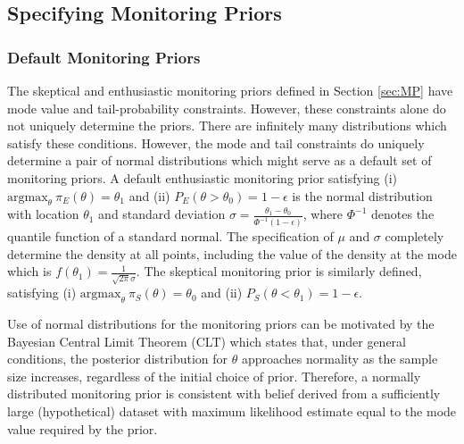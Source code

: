 \documentclass[AMA,STIX1COL,doublespace]{WileyNJD-v2}
\begin{document}
\subsection{Specifying Monitoring Priors}\label{sec:mps}
\subsubsection{Default Monitoring Priors}
The skeptical and enthusiastic monitoring priors defined in Section \ref{sec:MP} have mode value and tail-probability constraints. 
%
However, these constraints alone do not uniquely determine the priors.
%
There are infinitely many distributions which satisfy these conditions.
%
However, the mode and tail constraints do uniquely determine a pair of normal distributions which might serve as a default set of monitoring priors. 
%
%
A default enthusiastic monitoring prior satisfying (i) $\text{argmax}_\theta~\pi_E(\theta)=\theta_1$
and (ii) $P_E(\theta > \theta_0)=1-\epsilon$ is the normal distribution with location $\theta_1$ and standard deviation $\sigma=\frac{\theta_1-\theta_0}{\Phi^{-1}(1-\epsilon)}$, where $\Phi^{-1}$ denotes the quantile function of a standard normal.
%
The specification of $\mu$ and $\sigma$ completely determine the density at all points, including the value of the density at the mode which is $f(\theta_1)=\frac{1}{\sqrt{2\pi}\sigma}$.
%
The skeptical monitoring prior is similarly defined, satisfying (i) $\text{argmax}_\theta~\pi_S(\theta)=\theta_0$ and (ii) $P_S(\theta < \theta_1)=1-\epsilon$.

Use of normal distributions for the monitoring priors can be motivated by the Bayesian Central Limit Theorem (CLT) \citep{LeCam2000} which states that, under general conditions, the posterior distribution for $\theta$ approaches normality as the sample size increases, regardless of the initial choice of prior.
%
Therefore, a normally distributed monitoring prior is consistent with belief derived from a sufficiently large (hypothetical) dataset with maximum likelihood estimate equal to the mode value required by the prior.
\end{document}
